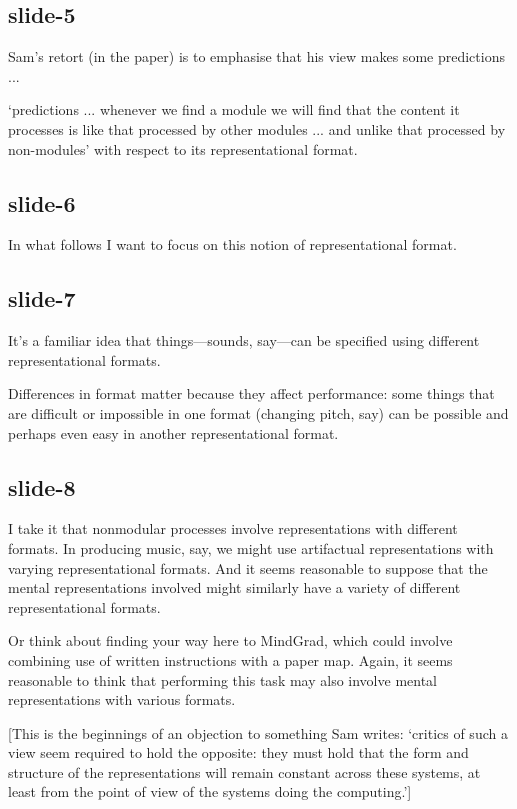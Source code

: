 \documentclass[12pt,\papersize]{extarticle}
\begin{document}
\subsection{slide-5}
Sam’s retort (in the paper) is to emphasise that his view makes some predictions ...

‘predictions ... whenever we find a module we will find that the content it processes is like that processed by other modules ... and unlike that processed by non-modules’ with respect to its representational format.

\subsection{slide-6}
In what follows I want to focus on this notion of representational format.

\subsection{slide-7}
It’s a familiar idea that things---sounds, say---can be specified using
different representational formats.

Differences in format matter because they affect performance: some things that
are difficult or impossible in one format (changing pitch, say) can be
possible and perhaps even easy in another representational format.

\subsection{slide-8}
I take it that nonmodular processes involve representations with different formats.
In producing music, say, we might use artifactual representations with varying
representational formats.
And it seems reasonable to suppose that the mental representations involved might similarly
have a variety of different representational formats.

Or think about finding your way here to MindGrad, which could involve
combining use of written instructions with a paper map.
Again, it seems reasonable to think that performing this task may also involve
mental representations with various formats.

[This is the beginnings of an objection to something Sam writes:
‘critics of such a view seem required to hold the opposite: they must hold that the form and
structure of the representations will remain constant across these systems, at least from the
point of view of the systems doing the computing.’]
\end{document}

